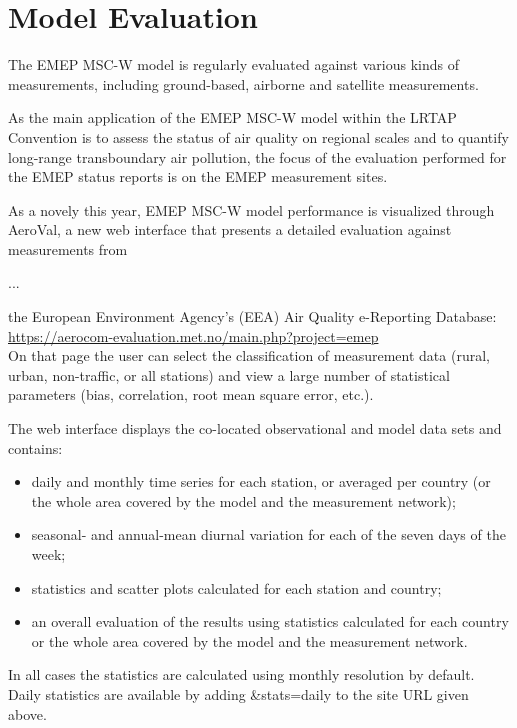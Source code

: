 \setcounter{page}{1}

\cleardoublepage
\chapter[2019 Model Evaluation]{Model Evaluation}
\label{ch:appx_modeleval}



The EMEP MSC-W model is regularly evaluated against various kinds of measurements, including ground-based, airborne and satellite measurements.

As the main application of the EMEP MSC-W model within the LRTAP Convention is to assess the status of air quality on regional scales and to quantify long-range transboundary air pollution, the focus of the evaluation performed for the EMEP status reports is on the EMEP measurement sites.

As a novely this year, EMEP MSC-W model performance is visualized through
AeroVal, a new web interface that presents a detailed evaluation against measurements from

...

the European Environment Agency's (EEA) Air Quality e-Reporting Database:\\
\url{https://aerocom-evaluation.met.no/main.php?project=emep}\\
On that page the user can select the classification of measurement data
(rural, urban, non-traffic, or all stations) and view a large number of
statistical parameters (bias, correlation, root mean square error, etc.).

The web interface displays the co-located observational and model data sets
and contains:
\begin{itemize}

\item daily and monthly time series for each station, or averaged per
  country (or the whole area covered by the model and the measurement network);
\item seasonal- and annual-mean diurnal variation for each of the seven days of the week;
\item statistics and scatter plots calculated for each station and country;
\item an overall evaluation of the results using statistics calculated for
  each country or the whole area covered by the model and the measurement network.
\end{itemize}
In all cases the statistics are calculated using monthly resolution
by default. Daily statistics are available by adding \&stats=daily to the
site URL given above.

